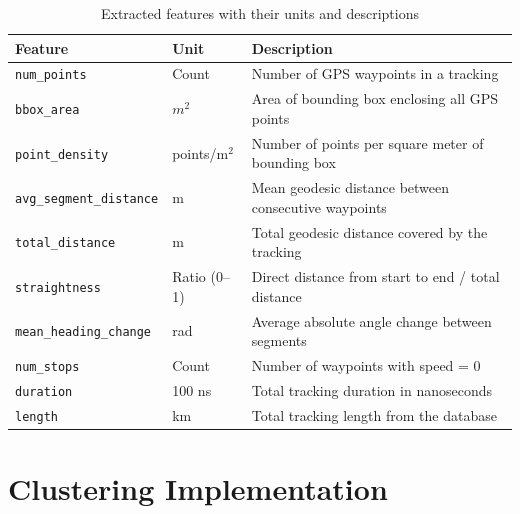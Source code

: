\documentclass[a4paper,12pt,twoside]{scrreprt}
\begin{document}
\begin{table}[ht]
  \centering
  \begin{tabular}{|l|l|l|}
    \hline
    \textbf{Feature}                & \textbf{Unit} & \textbf{Description}
    \\
    \hline
    \texttt{num\_points}            & Count         & Number of GPS waypoints
    in a tracking
    \\
    \texttt{bbox\_area}             & $m^2$         & Area of bounding box
    enclosing all GPS points
    \\
    \texttt{point\_density}         & points/m$^2$  & Number of points per
    square meter
    of bounding box
    \\
    \texttt{avg\_segment\_distance} & m             & Mean geodesic distance
    between
    consecutive waypoints
    \\
    \texttt{total\_distance}        & m             & Total geodesic distance
    covered by the
    tracking
    \\
    \texttt{straightness}           & Ratio (0–1)   & Direct distance from
    start to end /
    total distance
    \\
    \texttt{mean\_heading\_change}  & rad           & Average absolute angle
    change
    between segments
    \\
    \texttt{num\_stops}             & Count         & Number of waypoints with
    speed = 0
    \\
    \texttt{duration}               & 100 ns        & Total tracking
    duration in nanoseconds
    \\
    \texttt{length}                 & km            & Total tracking length
    from the database
    \\
    \hline
  \end{tabular}
  \caption{Extracted features with their units and descriptions}
  \label{tab:feature_units}
\end{table}

\section{Clustering Implementation}


\end{document}
